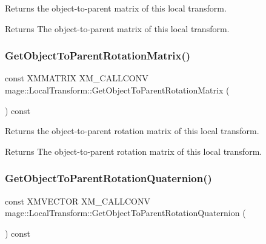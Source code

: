 Returns the object-\/to-\/parent matrix of this local transform.

\begin{DoxyReturn}{Returns}
The object-\/to-\/parent matrix of this local transform. 
\end{DoxyReturn}
\mbox{\label{classmage_1_1_local_transform_a43be02da78f59f2e6ab5d5719816498b}} 
\subsubsection{\texorpdfstring{Get\+Object\+To\+Parent\+Rotation\+Matrix()}{GetObjectToParentRotationMatrix()}}
{\footnotesize\ttfamily const X\+M\+M\+A\+T\+R\+IX X\+M\+\_\+\+C\+A\+L\+L\+C\+O\+NV mage\+::\+Local\+Transform\+::\+Get\+Object\+To\+Parent\+Rotation\+Matrix (\begin{DoxyParamCaption}{ }\end{DoxyParamCaption}) const\hspace{0.3cm}{\ttfamily [noexcept]}}

Returns the object-\/to-\/parent rotation matrix of this local transform.

\begin{DoxyReturn}{Returns}
The object-\/to-\/parent rotation matrix of this local transform. 
\end{DoxyReturn}
\mbox{\label{classmage_1_1_local_transform_a5d9cb07de3b11b31665f2bb35580febc}} 
\subsubsection{\texorpdfstring{Get\+Object\+To\+Parent\+Rotation\+Quaternion()}{GetObjectToParentRotationQuaternion()}}
{\footnotesize\ttfamily const X\+M\+V\+E\+C\+T\+OR X\+M\+\_\+\+C\+A\+L\+L\+C\+O\+NV mage\+::\+Local\+Transform\+::\+Get\+Object\+To\+Parent\+Rotation\+Quaternion (\begin{DoxyParamCaption}{ }\end{DoxyParamCaption}) const\hspace{0.3cm}{\ttfamily [noexcept]}}

